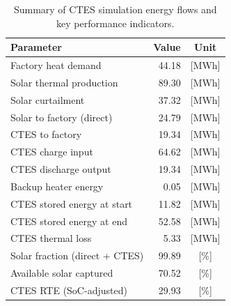 \renewcommand{\arraystretch}{1.2}
\begin{table}[h]
\centering
\begin{tabular}{l|r c}
\hline
Parameter & Value & Unit \\
\hline
Factory heat demand & 44.18 & [MWh] \\
Solar thermal production & 89.30 & [MWh] \\
Solar curtailment & 37.32 & [MWh] \\
Solar to factory (direct) & 24.79 & [MWh] \\
CTES to factory & 19.34 & [MWh] \\
CTES charge input & 64.62 & [MWh] \\
CTES discharge output & 19.34 & [MWh] \\
Backup heater energy & 0.05 & [MWh] \\
CTES stored energy at start & 11.82 & [MWh] \\
CTES stored energy at end & 52.58 & [MWh] \\
CTES thermal loss & 5.33 & [MWh] \\
\hline
Solar fraction (direct + CTES) & 99.89 & [\%] \\
Available solar captured & 70.52 & [\%] \\
CTES RTE (SoC-adjusted) & 29.93 & [\%] \\
\hline
\end{tabular}
\caption{Summary of CTES simulation energy flows and key performance indicators.}
\label{tab:ctes-simulation-summary}
\end{table}

